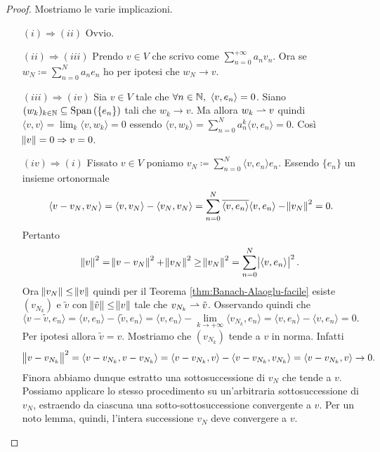 \begin{proof}
    Mostriamo le varie implicazioni.
    \begin{itemize}
        \item[$ (i) \Rightarrow (ii) $] Ovvio.
        \item[$ (ii) \Rightarrow (iii) $] Prendo $ v \in V $ che scrivo come $ \sum_{n = 0}^{+\infty} a_n v_n $. Ora se $ w_{N} \coloneqq \sum_{n = 0}^{N} a_ne_n $ ho per ipotesi che $ w_N \to v $. 
        \item[$ (iii) \Rightarrow (iv) $] Sia $ v \in V $ tale che $ \forall n \in \mathbb{N}, \ {\langle v, e_n \rangle} = 0 $. Siano $ (w_k)_{k \in \mathbb{N}} \subseteq \operatorname{Span}{(\{e_n\})} $ tali che $ w_k \to v $. Ma allora $ w_k \rightharpoonup v $ quindi $ {\langle v, v \rangle} = \lim_{k} {\langle v, w_k \rangle} = 0 $ essendo $ {\langle v, w_k \rangle} = \sum_{n = 0}^{N} a_n^k {\langle v, e_n \rangle} = 0 $. Così $ \norm{v} = 0 \Rightarrow v = 0 $.
        \item[$ (iv) \Rightarrow (i) $] Fissato $ v \in V $ poniamo $ v_N \coloneqq \sum_{n = 0}^{N} {\langle v, e_n \rangle} e_n $. Essendo $ \{e_n\} $ un insieme ortonormale
        \[
            {\langle v - v_N, v_N \rangle} = {\langle v, v_N \rangle} - {\langle v_N, v_N \rangle} = \sum_{n = 0}^{N} \overline{{\langle v, e_n \rangle}}{\langle v, e_n \rangle} - \norm{v_N}^2 = 0.
        \]
        Pertanto
        \[
            \norm{v}^2 = \norm{v - v_N}^2 + \norm{v_N}^2 \geq \norm{v_N}^2 = \sum_{n = 0}^{N} \abs{{\langle v, e_n \rangle}}^2.
        \]
        Ora $ \norm{v_N} \leq \norm{v} $ quindi per il Teorema \ref{thm:Banach-Alaoglu-facile} esiste $ (v_{N_k}) $ e $ \tilde{v} $ con $ \norm{\tilde{v}} \leq \norm{v} $ tale che $ v_{N_k} \rightharpoonup \tilde{v} $. Osservando quindi che
        \[
            {\langle v - \tilde{v}, e_n \rangle} = {\langle v, e_n \rangle} - {\langle \tilde{v}, e_n \rangle} = {\langle v, e_n \rangle} - \lim_{k \to + \infty} {\langle v_{N_k}, e_n \rangle} = {\langle v, e_n \rangle} - {\langle v, e_n \rangle} = 0.
        \]
        Per ipotesi allora $ \tilde{v} = v $. Mostriamo che $ (v_{N_k}) $ tende a $ v $ in norma. Infatti
        \[
            \norm{v - v_{N_k}}^2 = {\langle v - v_{N_k}, v - v_{N_k}\rangle} = {\langle v - v_{N_k}, v \rangle} - {\langle v - v_{N_k}, v_{N_k} \rangle} = {\langle v - v_{N_k}, v \rangle} \to 0.
        \]
        Finora abbiamo dunque estratto una sottosuccessione di $ v_N $ che tende a $ v $. Possiamo applicare lo stesso procedimento su un'arbitraria sottosuccessione di $ v_N $, estraendo da ciascuna una sotto-sottosuccessione convergente a $ v $. Per un noto lemma, quindi, l'intera successione $ v_N $ deve convergere a $ v $. \qedhere
    \end{itemize}
\end{proof}

